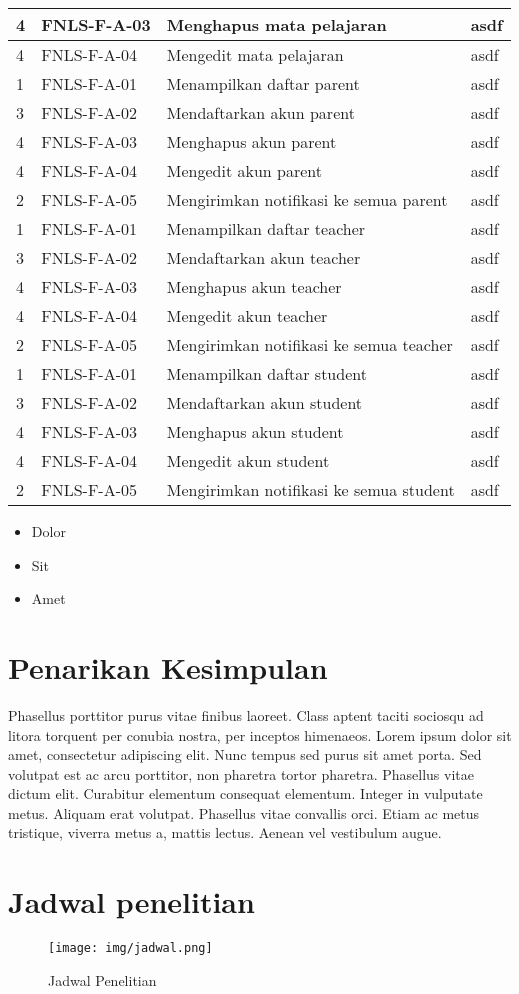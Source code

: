 \begin{longtable}[c]{|l|l|p{3cm}|p{7cm}|}
4 & FNLS-F-A-03 & Menghapus mata pelajaran & asdf\\ \hline
4 & FNLS-F-A-04 & Mengedit mata pelajaran & asdf\\ \hline
1 & FNLS-F-A-01 & Menampilkan daftar parent & asdf\\ \hline
3 & FNLS-F-A-02 & Mendaftarkan akun parent & asdf\\ \hline
4 & FNLS-F-A-03 & Menghapus akun parent & asdf\\ \hline
4 & FNLS-F-A-04 & Mengedit akun parent & asdf\\ \hline
2 & FNLS-F-A-05 & Mengirimkan notifikasi ke semua parent & asdf\\ \hline
1 & FNLS-F-A-01 & Menampilkan daftar teacher & asdf\\ \hline
3 & FNLS-F-A-02 & Mendaftarkan akun teacher & asdf\\ \hline
4 & FNLS-F-A-03 & Menghapus akun teacher & asdf\\ \hline
4 & FNLS-F-A-04 & Mengedit akun teacher & asdf\\ \hline
2 & FNLS-F-A-05 & Mengirimkan notifikasi ke semua teacher & asdf\\ \hline
1 & FNLS-F-A-01 & Menampilkan daftar student & asdf\\ \hline
3 & FNLS-F-A-02 & Mendaftarkan akun student & asdf\\ \hline
4 & FNLS-F-A-03 & Menghapus akun student & asdf\\ \hline
4 & FNLS-F-A-04 & Mengedit akun student & asdf\\ \hline
2 & FNLS-F-A-05 & Mengirimkan notifikasi ke semua student & asdf\\ \hline
  \bottomrule
\end{longtable}

\begin{itemize}
\item Dolor
\item Sit
\item Amet
\end{itemize}


\section{Penarikan Kesimpulan}
\label{subsec:label}

Phasellus porttitor purus \textcite{warn} vitae finibus laoreet. Class
aptent taciti sociosqu ad litora torquent per conubia nostra, per
inceptos himenaeos. Lorem ipsum dolor sit amet, consectetur adipiscing
elit. Nunc tempus sed purus sit amet porta. Sed volutpat est ac arcu
porttitor, non pharetra tortor pharetra. Phasellus vitae dictum
elit. Curabitur elementum consequat elementum. Integer in vulputate
metus. Aliquam erat volutpat. Phasellus vitae convallis orci. Etiam ac
metus tristique, viverra metus a, mattis lectus. Aenean vel vestibulum
augue.

\section{Jadwal penelitian}
\label{subsec:label}

\begin{figure}[tph]
  \centering
  \texttt{[image: img/jadwal.png]}
  \caption{Jadwal Penelitian}
  \label{fig:jadwal-penelitian}
\end{figure}
